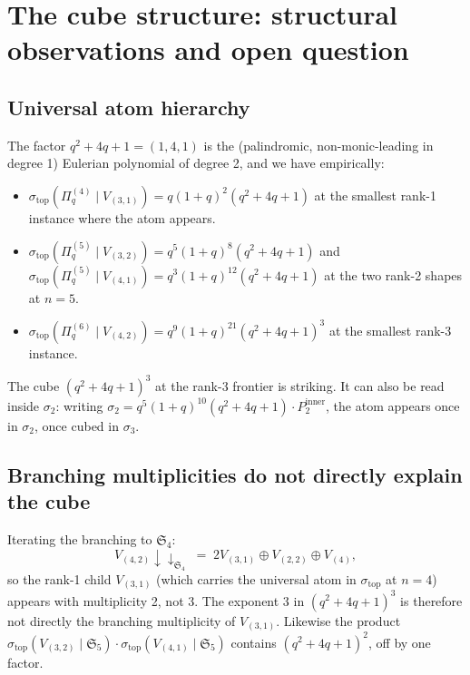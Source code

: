 \documentclass[11pt]{article}
\theoremstyle{plain}
\theoremstyle{definition}
\theoremstyle{remark}
\newcommand{\Sym}{\mathfrak{S}}
\newcommand{\Pibs}{\Pi_q}
\begin{document}
\section{The cube structure: structural observations and open question}

\subsection{Universal atom hierarchy}

The factor $q^2 + 4q + 1 = (1, 4, 1)$ is the (palindromic, non-monic-leading
in degree 1) Eulerian polynomial of degree 2, and we have empirically:

\begin{itemize}
\item $\sigma_{\text{top}}(\Pibs^{(4)} \mid V_{(3,1)}) = q(1+q)^2(q^2+4q+1)$ at the smallest
rank-1 instance where the atom appears.
\item $\sigma_{\text{top}}(\Pibs^{(5)} \mid V_{(3,2)}) = q^5(1+q)^8(q^2+4q+1)$ and
$\sigma_{\text{top}}(\Pibs^{(5)} \mid V_{(4,1)}) = q^3(1+q)^{12}(q^2+4q+1)$ at the
two rank-2 shapes at $n=5$.
\item $\sigma_{\text{top}}(\Pibs^{(6)} \mid V_{(4,2)}) = q^9(1+q)^{21}(q^2+4q+1)^3$ at
the smallest rank-3 instance.
\end{itemize}

The cube $(q^2+4q+1)^3$ at the rank-3 frontier is striking. It can also be
read inside $\sigma_2$: writing $\sigma_2 = q^5(1+q)^{10}(q^2+4q+1)\cdot
P_2^{\mathrm{inner}}$, the atom appears once in $\sigma_2$, once cubed in
$\sigma_3$.

\subsection{Branching multiplicities do not directly explain the cube}

Iterating the branching to $\Sym_4$:
\[
V_{(4,2)} \downarrow\downarrow_{\Sym_4} \;=\; 2 V_{(3,1)} \oplus V_{(2,2)} \oplus V_{(4)},
\]
so the rank-1 child $V_{(3,1)}$ (which carries the universal atom in
$\sigma_{\text{top}}$ at $n = 4$) appears with multiplicity 2, not 3. The
exponent $3$ in $(q^2+4q+1)^3$ is therefore not directly the
branching multiplicity of $V_{(3,1)}$. Likewise the product
$\sigma_{\text{top}}(V_{(3,2)} \mid \Sym_5) \cdot \sigma_{\text{top}}(V_{(4,1)} \mid \Sym_5)$
contains $(q^2+4q+1)^2$, off by one factor.
\end{document}
